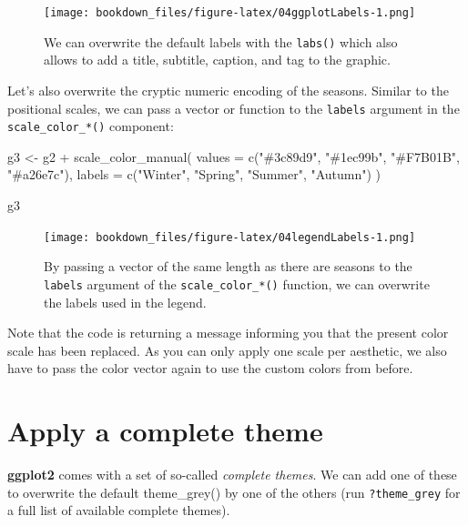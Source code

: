 \documentclass[
]{krantz}
\makeatletter
\newenvironment{Shaded}{\begin{snugshade}}{\end{snugshade}}
\newcommand{\AttributeTok}[1]{\textcolor[rgb]{0.61,0.61,0.61}{#1}}
\newcommand{\FunctionTok}[1]{\textcolor[rgb]{0,0,0}{#1}}
\newcommand{\NormalTok}[1]{#1}
\newcommand{\OtherTok}[1]{\textcolor[rgb]{0.37,0.37,0.37}{#1}}
\newcommand{\SpecialCharTok}[1]{\textcolor[rgb]{0,0,0}{#1}}
\newcommand{\StringTok}[1]{\textcolor[rgb]{0.5,0.5,0.5}{#1}}
\newenvironment{kframe}{%
\medskip{}
\setlength{\fboxsep}{.8em}
 \def\at@end@of@kframe{}%
 \ifinner\ifhmode%
  \def\at@end@of@kframe{\end{minipage}}%
  \begin{minipage}{\columnwidth}%
 \fi\fi%
 \def\FrameCommand##1{\hskip\@totalleftmargin \hskip-\fboxsep
 \colorbox{shadecolor}{##1}\hskip-\fboxsep
     \hskip-\linewidth \hskip-\@totalleftmargin \hskip\columnwidth}%
 \MakeFramed {\advance\hsize-\width
   \@totalleftmargin\z@ \linewidth\hsize
   \@setminipage}}%
 {\par\unskip\endMakeFramed%
 \at@end@of@kframe}
\renewenvironment{Shaded}{\begin{kframe}}{\end{kframe}}
\makeatother
\begin{document}
\begin{figure}
\centering
\texttt{[image: bookdown\_files/figure-latex/04ggplotLabels-1.png]}
\caption{\label{fig:04ggplotLabels}We can overwrite the default labels with the \texttt{labs()} which also allows to add a title, subtitle, caption, and tag to the graphic.}
\end{figure}

Let's also overwrite the cryptic numeric encoding of the seasons. Similar to the positional scales, we can pass a vector or function to the \texttt{labels} argument in the \texttt{scale\_color\_*()} component:

\begin{Shaded}
\begin{Highlighting}[]
\NormalTok{g3 }\OtherTok{\textless{}{-}}\NormalTok{ g2 }\SpecialCharTok{+}
  \FunctionTok{scale\_color\_manual}\NormalTok{(}
    \AttributeTok{values =} \FunctionTok{c}\NormalTok{(}\StringTok{"\#3c89d9"}\NormalTok{, }\StringTok{"\#1ec99b"}\NormalTok{, }\StringTok{"\#F7B01B"}\NormalTok{, }\StringTok{"\#a26e7c"}\NormalTok{),}
    \AttributeTok{labels =} \FunctionTok{c}\NormalTok{(}\StringTok{"Winter"}\NormalTok{, }\StringTok{"Spring"}\NormalTok{, }\StringTok{"Summer"}\NormalTok{, }\StringTok{"Autumn"}\NormalTok{)}
\NormalTok{  )}

\NormalTok{g3}
\end{Highlighting}
\end{Shaded}

\begin{figure}
\centering
\texttt{[image: bookdown\_files/figure-latex/04legendLabels-1.png]}
\caption{\label{fig:04legendLabels}By passing a vector of the same length as there are seasons to the \texttt{labels} argument of the \texttt{scale\_color\_*()} function, we can overwrite the labels used in the legend.}
\end{figure}

Note that the code is returning a message informing you that the present color scale has been replaced. As you can only apply one scale per aesthetic, we also have to pass the color vector again to use the custom colors from before.

\hypertarget{complete-themes}{%
\section{Apply a complete theme}\label{complete-themes}}

\textbf{ggplot2} comes with a set of so-called \emph{complete themes}. We can add one of these to overwrite the default theme\_grey() by one of the others (run \texttt{?theme\_grey} for a full list of available complete themes).
\end{document}
